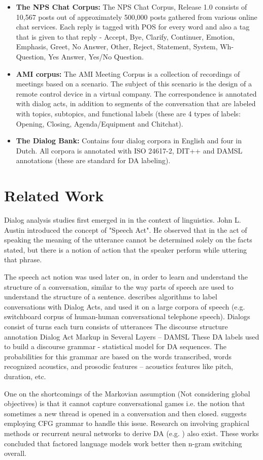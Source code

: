 \begin{itemize}
	\item {\bf The NPS Chat Corpus:} The NPS Chat Corpus, Release 1.0 consists of 10,567 posts 
	out of approximately 500,000 posts gathered from various online chat services.
	Each reply is tagged with POS for every word and also a tag that is given to that reply - Accept, Bye, Clarify, Continuer, Emotion, Emphasis, Greet, No Answer, Other, Reject, Statement, System, Wh-Question, Yes Answer, Yes/No Question.
	\item {\bf AMI corpus:} The AMI Meeting Corpus is a collection of recordings of meetings based on a scenario. 
	The subject of this scenario is the design of a remote control device in a virtual company.
	The correspondence is annotated with dialog acts, in addition to segments of the conversation that are labeled with topics, 
	subtopics, and functional labels (these are 4 types of labels: Opening, Closing, Agenda/Equipment and Chitchat).
	\item {\bf The Dialog Bank:} Contains four dialog corpora in English and four in Dutch. 
	All corpora is annotated with ISO 24617-2, DIT++ and DAMSL annotations (these are standard for DA labeling).
\end{itemize}

\section{Related Work}
Dialog analysis studies first emerged in in the context of linguistics.
John L. Austin introduced the concept of "Speech Act". He observed that in the act of speaking 
the meaning of the utterance cannot be determined solely on the facts stated, 
but there is a notion of action that the speaker perform while uttering that phrase.

The speech act notion was used later on, in order to learn and understand the structure of a conversation, similar to the way parts of speech are used to understand the structure of a sentence. \cite{cs-CL-0006023} describes algorithms to label conversations with Dialog Acts, and used it on a large corpora of speech (e.g. switchboard corpus of human-human conversational telephone speech). 
Dialogs consist of turns each turn consists of utterances
The discourse structure annotation Dialog Act Markup in Several Layers – DAMSL
These DA labels used to build a discourse grammar - statistical model for DA sequences.
The probabilities for this grammar are based on the words transcribed, words recognized acoustics, 
and prosodic features – acoustics features like pitch, duration, etc.

One on the shortcomings of the Markovian assumption (Not considering global objectives) is that it cannot capture conversational games i.e. the notion that sometimes a new thread is opened in a conversation and then closed. 
\cite{Geertzen} suggests employing CFG grammar to handle this issue.
Research on involving graphical methods or recurrent neural networks to derive DA (e.g. \cite{DBLP:conf/icassp/JiB05,DBLP:conf/coling/WermterL96}) also exist. These works concluded that factored language models work better then n-gram switching overall.